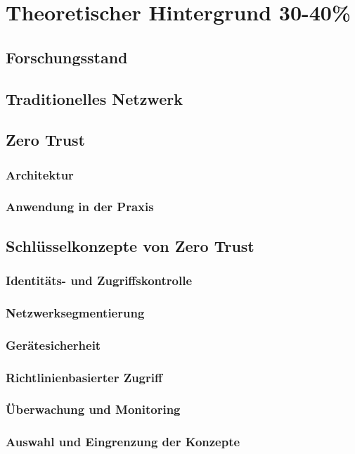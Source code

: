 \section{Theoretischer Hintergrund 30-40\%}

\subsection{Forschungsstand}


\subsection{Traditionelles Netzwerk}
\subsection{Zero Trust}
\subsubsection{Architektur}
\subsubsection{Anwendung in der Praxis}
\subsection{Schlüsselkonzepte von Zero Trust}
\subsubsection{Identitäts- und Zugriffskontrolle}
\subsubsection{Netzwerksegmentierung}
\subsubsection{Gerätesicherheit}
\subsubsection{Richtlinienbasierter Zugriff}
\subsubsection{Überwachung und Monitoring}
\subsubsection{Auswahl und Eingrenzung der Konzepte}


